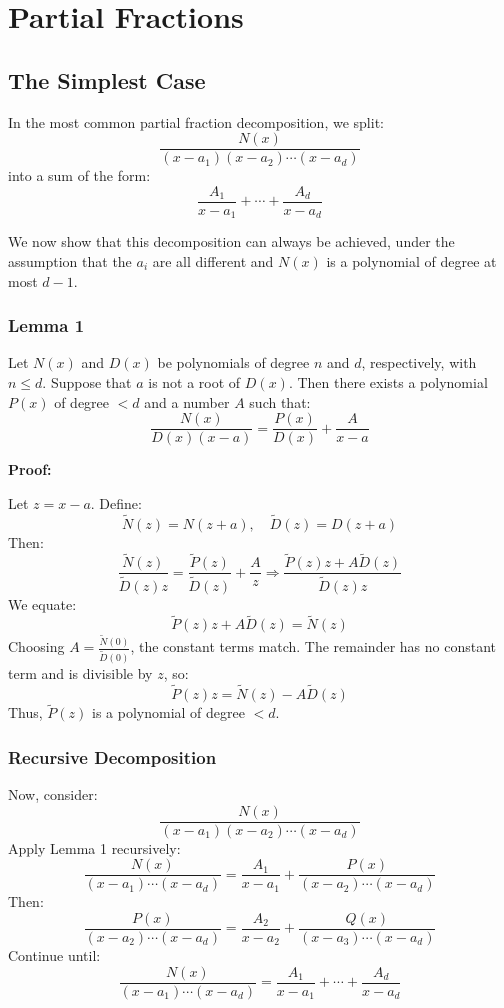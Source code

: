 \newpage
\section{Partial Fractions}

\subsection{The Simplest Case}

In the most common partial fraction decomposition, we split:
\[
\frac{N(x)}{(x - a_1)(x - a_2)\cdots(x - a_d)}
\]
into a sum of the form:
\[
\frac{A_1}{x - a_1} + \cdots + \frac{A_d}{x - a_d}
\]

We now show that this decomposition can always be achieved, under the assumption that the \(a_i\) are all different and \(N(x)\) is a polynomial of degree at most \(d - 1\).

\subsubsection{Lemma 1}

Let \(N(x)\) and \(D(x)\) be polynomials of degree \(n\) and \(d\), respectively, with \(n \leq d\). Suppose that \(a\) is not a root of \(D(x)\). Then there exists a polynomial \(P(x)\) of degree \(< d\) and a number \(A\) such that:
\[
\frac{N(x)}{D(x)(x - a)} = \frac{P(x)}{D(x)} + \frac{A}{x - a}
\]

\textbf{Proof:} 

Let \(z = x - a\). Define:
\[
\tilde{N}(z) = N(z + a), \quad \tilde{D}(z) = D(z + a)
\]
Then:
\[
\frac{\tilde{N}(z)}{\tilde{D}(z)z} = \frac{\tilde{P}(z)}{\tilde{D}(z)} + \frac{A}{z}
\Rightarrow \frac{\tilde{P}(z)z + A\tilde{D}(z)}{\tilde{D}(z)z}
\]
We equate:
\[
\tilde{P}(z)z + A\tilde{D}(z) = \tilde{N}(z)
\]
Choosing \(A = \frac{\tilde{N}(0)}{\tilde{D}(0)}\), the constant terms match. The remainder has no constant term and is divisible by \(z\), so:
\[
\tilde{P}(z)z = \tilde{N}(z) - A\tilde{D}(z)
\]
Thus, \(\tilde{P}(z)\) is a polynomial of degree \(< d\).

\subsubsection{Recursive Decomposition}

Now, consider:
\[
\frac{N(x)}{(x - a_1)(x - a_2)\cdots(x - a_d)}
\]
Apply Lemma 1 recursively:
\[
\frac{N(x)}{(x - a_1)\cdots(x - a_d)} = \frac{A_1}{x - a_1} + \frac{P(x)}{(x - a_2)\cdots(x - a_d)}
\]
Then:
\[
\frac{P(x)}{(x - a_2)\cdots(x - a_d)} = \frac{A_2}{x - a_2} + \frac{Q(x)}{(x - a_3)\cdots(x - a_d)}
\]
Continue until:
\[
\frac{N(x)}{(x - a_1)\cdots(x - a_d)} = \frac{A_1}{x - a_1} + \cdots + \frac{A_d}{x - a_d}
\]

